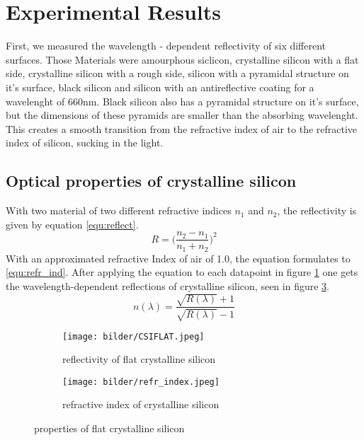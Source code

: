 \section{Experimental Results}
First, we measured the wavelength - dependent reflectivity of six different  surfaces.
Those Materials were amourphous siclicon, crystalline silicon with a flat side,
crystalline silicon with a rough side, silicon with a pyramidal structure on it's surface,
black silicon and silicon with an antireflective coating for a wavelenght of 660nm.
Black silicon also has a pyramidal structure on it's surface, but the dimensions of
these pyramids are smaller than the absorbing wavelenght. This creates a smooth transition
from the refractive index of air to the refractive index of silicon, sucking in the light.

\subsection{Optical properties of crystalline silicon}
With two material of two different refractive indices $n_1$ and $n_2$,
the reflectivity is given by equation \ref{equ:reflect}.
\begin{equation}
  R = \bigg(\frac{n_2 - n_1}{n_1 + n_2}\bigg)^2
  \label{equ:reflect}
\end{equation}
With an approximated refractive Index of air of 1.0,
the equation formulates to \ref{equ:refr_ind}. After applying the equation to each datapoint in figure \ref{fig:csiflat} one gets the wavelength-dependent reflections of crystalline silicon, seen in figure \ref{fig:refr_index}. 
\begin{equation}
  n(\lambda) = \frac{\sqrt{R(\lambda)} + 1 }{ \sqrt{R(\lambda)} - 1}
  \label{equ:refr_ind}
\end{equation}
\begin{figure}[h]
  \centering
  \begin{subfigure}[b]{0.45\textwidth}
    \texttt{[image: bilder/CSIFLAT.jpeg]}
    \caption{reflectivity of flat crystalline silicon} 
    \label{fig:csiflat}
  \end{subfigure}
  \begin{subfigure}[b]{0.45\textwidth}
    \texttt{[image: bilder/refr\_index.jpeg]}
    \caption{refractive index of crystalline silicon}
    \label{fig:refr_index}
  \end{subfigure}
  \caption{properties of flat crystalline silicon}
\end{figure}

